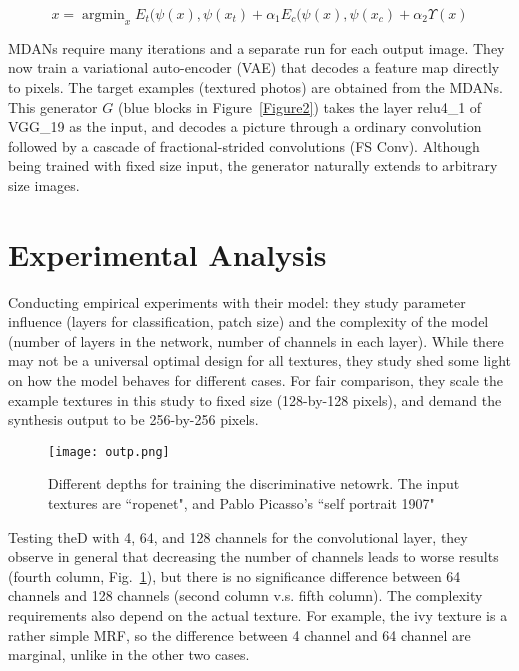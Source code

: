 \documentclass[10pt,twocolumn,letterpaper]{article}
\begin{document}
\begin{equation}
x=\mathop{\arg\min}_{x} E_t(\psi(x),\psi(x_t)+\alpha_1E_c(\psi(x),\psi(x_c)+\alpha_2\Upsilon(x)
\end{equation}
\par MDANs require many iterations and a separate run for each output image. They now train a variational auto-encoder (VAE) that decodes a feature map directly to pixels. The target examples (textured photos) are obtained from the MDANs. This generator $G$ (blue blocks in Figure~\ref{Figure2}) takes the layer relu4\_1 of VGG\_19
as the input, and decodes a picture through a ordinary convolution followed by a cascade of fractional-strided convolutions (FS Conv). Although being trained with fixed size input, the generator naturally extends to arbitrary size images.
\section{Experimental Analysis}
Conducting empirical experiments with their model: they study parameter influence (layers for classification, patch size) and the complexity of the model (number of layers in the network, number of channels in each layer). While there may not be a universal optimal design for all textures, they study shed some light on how the model behaves for different cases. For fair comparison, they scale the example textures in this study to fixed size (128-by-128 pixels), and demand the synthesis output to be 256-by-256 pixels.
\begin{figure}[!htb]
	\centering
	\texttt{[image: outp.png]}\\
	\caption{Different depths for training the discriminative netowrk. The input textures are ``ropenet", and Pablo Picasso’s ``self portrait 1907"}\label{Figure3}
\end{figure}
\par Testing the$ $D with 4, 64, and 128 channels for the convolutional layer, they observe in general that decreasing the number of channels leads to worse results (fourth column, Fig.~\ref{Figure3}), but there is no significance difference between 64 channels and 128 channels (second column v.s. fifth column). The complexity requirements also depend on the actual texture. For example, the ivy texture is a rather simple MRF, so the difference between 4 channel and 64 channel are marginal, unlike in the other two cases.


\end{document}
